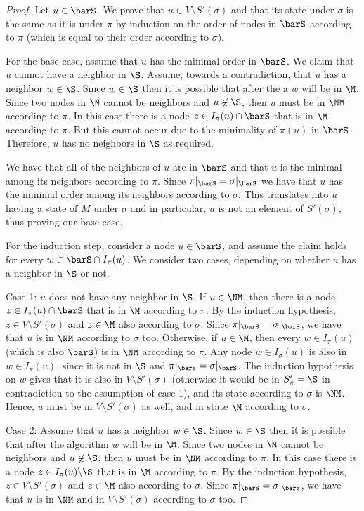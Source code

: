 \begin{proof}
Let $u \in \barS$. We prove that $u \in V \setminus S'(\sigma)$ and that its state under $\sigma$ is the same as it is under $\pi$ by induction on the order of nodes in $\barS$ according to $\pi$ (which is equal to their order according to $\sigma$).



For the base case, assume that $u$ has the minimal order in $\barS$.
We claim that $u$ cannot have a neighbor in $\S$.
Assume, towards a contradiction, that $u$ has a neighbor $w\in\S$. Since $w\in\S$ then it is possible that after the a $w$ will be in $\M$. Since two nodes in $\M$ cannot be neighbors and $u \not\in\S$, then $u$ must be in $\NM$ according to $\pi$. In this case there is a node $z\in I_{\pi}(u)\cap\barS$ that is in $\M$ according to $\pi$. But this cannot occur due to the minimality of $\pi(u)$ in $\barS$. Therefore, $u$ has no neighbors in $\S$ as required.

We have that all of the neighbors of $u$ are in $\barS$ and that $u$ is the minimal among its neighbors according to $\pi$. Since $\pi|_{\barS}=\sigma|_{\barS}$ we have that $u$ has the minimal order among its neighbors according to $\sigma$. This translates into $u$ having a state of $M$ under $\sigma$ and in particular, $u$ is not an element of $S'(\sigma)$, thus proving our base case.


For the induction step, consider a node $u\in\barS$, and assume the claim holds for every $w \in \barS \cap I_{\pi}(u)$. We consider two cases, depending on whether $u$ has a neighbor in $\S$ or not.

Case 1:  $u$ does not have any neighbor in $\S$.
If $u \in \NM$, then there is a node $z\in I_{\pi}(u)\cap \barS$ that is in $\M$ according to $\pi$. By the induction hypothesis, $z \in V \setminus S'(\sigma)$ and $z \in \M$ also according to $\sigma$. Since $\pi|_{\barS}=\sigma|_{\barS}$, we have that $u$ is in $\NM$ according to $\sigma$ too.
Otherwise, if $u \in \M$, then every $w\in I_{\pi}(u)$ (which is also $\barS$) is in $\NM$ according to $\pi$.
Any node $w \in I_{\sigma}(u)$ is also in $w \in I_{\pi}(u)$, since it is not in $\S$ and $\pi|_{\barS}=\sigma|_{\barS}$. The induction hypothesis on $w$ gives that it is also in $V \setminus S'(\sigma)$ (otherwise it would be in $S'_{\pi}=\S$ in contradiction to the assumption of case 1), and its state according to $\sigma$ is $\NM$. Hence, $u$ must be in $V \setminus S'(\sigma)$ as well, and in state $\M$ according to $\sigma$.


Case 2: Assume that $u$ has a neighbor $w\in\S$. Since $w\in\S$ then it is possible that after the algorithm $w$ will be in $\M$. Since two nodes in $\M$ cannot be neighbors and $u \not\in\S$, then $u$ must be in $\NM$ according to $\pi$. In this case there is a node $z\in I_{\pi}(u)\backslash\S$ that is in $\M$ according to $\pi$. By the induction hypothesis, $z \in V \setminus S'(\sigma)$ and $z \in \M$ also according to $\sigma$. Since $\pi|_{\barS}=\sigma|_{\barS}$, we have that $u$ is in $\NM$ and in $V \setminus S'(\sigma)$ according to $\sigma$ too.
\end{proof}


